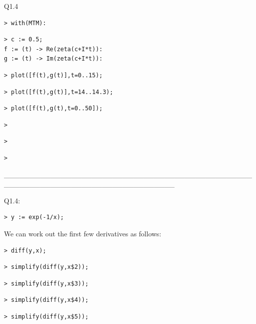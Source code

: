 \documentclass{article}
\begin{document}
\begin{Maple Normal}
Q1.4
\end{Maple Normal}
\begin{lstlisting}
> with(MTM):
\end{lstlisting}
\begin{lstlisting}
> c := 0.5;
f := (t) -> Re(zeta(c+I*t)):
g := (t) -> Im(zeta(c+I*t)):
\end{lstlisting}
\begin{lstlisting}
> plot([f(t),g(t)],t=0..15);
\end{lstlisting}
\begin{lstlisting}
> plot([f(t),g(t)],t=14..14.3);
\end{lstlisting}
\begin{lstlisting}
> plot([f(t),g(t),t=0..50]);
\end{lstlisting}
\begin{lstlisting}
> 
\end{lstlisting}
\begin{lstlisting}
> 
\end{lstlisting}
\begin{lstlisting}
> 
\end{lstlisting}
\begin{Maple Normal}
\_\_\_\_\_\_\_\_\_\_\_\_\_\_\_\_\_\_\_\_\_\_\_\_\_\_\_\_\_\_\_\_\_\_\_\_\_\_\_\_\_\_\_\_\_\_\_\_\_\_\_\_\_\_\_\_\_\_\_\_\_\_\_\_\_\_\_\_\_\_\_\_\_\_\_\_\_\_\_\_\_
\end{Maple Normal}
\begin{Maple Normal}
Q1.4:
\end{Maple Normal}
\begin{lstlisting}
> y := exp(-1/x);
\end{lstlisting}
\begin{Maple Normal}
We can work out the first few derivatives as follows:
\end{Maple Normal}
\begin{lstlisting}
> diff(y,x);
\end{lstlisting}
\begin{lstlisting}
> simplify(diff(y,x$2));
\end{lstlisting}
\begin{lstlisting}
> simplify(diff(y,x$3));
\end{lstlisting}
\begin{lstlisting}
> simplify(diff(y,x$4));
\end{lstlisting}
\begin{lstlisting}
> simplify(diff(y,x$5));
\end{lstlisting}
\end{document}
